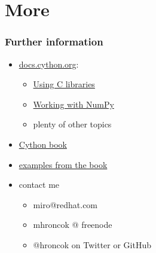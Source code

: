 \documentclass{beamer}
\begin{document}
\section{More}

\begin{frame}
  \frametitle{Further information}
    \begin{itemize}
      \item \href{http://docs.cython.org/}{docs.cython.org}:
      \begin{itemize}
        \item \href{http://docs.cython.org/src/tutorial/clibraries.html}{Using C libraries}
        \item \href{http://docs.cython.org/src/tutorial/numpy.html}{Working with NumPy}
        \item plenty of other topics
      \end{itemize}
      \item \href{http://shop.oreilly.com/product/0636920033431.do}{Cython book}
      \item \href{https://github.com/cythonbook/examples}{examples from the book}
      \item contact me
      \begin{itemize}
        \item miro@redhat.com
        \item mhroncok @ freenode
        \item @hroncok on Twitter or GitHub
      \end{itemize}
    \end{itemize}
\end{frame}
\end{document}
